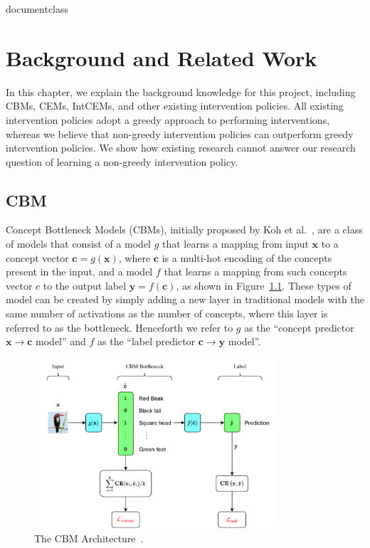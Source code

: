\csname documentclass

\chapter{Background and Related Work}

In this chapter, we explain the background knowledge
for this project, including CBMs, CEMs, IntCEMs,
and other existing intervention policies. All existing 
intervention policies adopt a greedy approach to performing interventions,
whereas we believe that non-greedy intervention policies can outperform greedy intervention policies.
We show how existing research cannot answer our research question
of learning a non-greedy intervention policy.

\section{CBM}\label{background:cbm}

Concept Bottleneck Models (CBMs), initially proposed by Koh et al.~\cite{cbm}, 
are a class of models
that consist of a model $g$ that learns a mapping from
input $\mathbf{x}$ to a concept vector $\mathbf{c} = g(\mathbf{x})$, 
where $\mathbf{c}$ is a multi-hot encoding of the concepts present in the input,
and a model $f$
that learns a mapping from such concepts vector $c$
to the output label $\mathbf{y} = f(\mathbf{c})$, as shown in Figure~\ref{fig:cbm}.
These types of model can be created by simply adding a new layer in traditional models
with the same number of activations as the number of concepts, where this layer
is referred to as the bottleneck. 
Henceforth we refer to $g$ as the ``concept predictor $\mathbf{x} \to \mathbf{c}$ model'' and $f$ as the
``label  predictor $\mathbf{c} \to \mathbf{y}$ model''.

\begin{figure}[!ht]
    \centering
    \includegraphics[width=0.8\textwidth]{figs/background/cbm.png}
    \caption{The CBM Architecture~\cite{cbm}.}
    \label{fig:cbm}
\end{figure}

